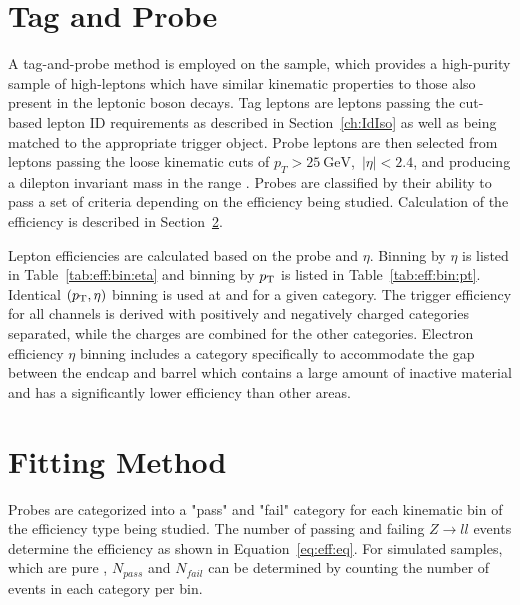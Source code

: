 % 
% 


\section{Tag and Probe}\label{ch:eff:tagandprobe}
A tag-and-probe method is employed on the \zll sample, which provides a high-purity sample of high-\pt leptons which have similar kinematic properties to those also present in the leptonic \W boson decays\cite{Khachatryan:2010xn}. Tag leptons are leptons passing the cut-based lepton ID requirements as described in Section~\ref{ch:IdIso} as well as being matched to the appropriate trigger object. Probe leptons are then selected from leptons passing the loose kinematic cuts of $p_T > 25 \mathrm{~GeV}$,~$|\eta|<2.4$, and producing a dilepton invariant mass in the range \masswindow. Probes are classified by their ability to pass a set of criteria depending on the efficiency being studied. Calculation of the efficiency is described in Section~\ref{ch:eff:fitting}.

Lepton efficiencies are calculated based on the probe \pt and $\eta$. Binning by $\eta$ is listed in Table~\ref{tab:eff:bin:eta} and binning by $p_{\mathrm{T}}$ is listed in Table~\ref{tab:eff:bin:pt}. Identical $(p_{\mathrm{T}},\eta)$ binning is used at \sg and \sh for a given category. The trigger efficiency for all channels is derived with positively and negatively charged categories separated, while the charges are combined for the other categories. Electron efficiency $\eta$ binning includes a category specifically to accommodate the gap between the endcap and barrel which contains a large amount of inactive material and has a significantly lower efficiency than other areas.






\section{Fitting Method}\label{ch:eff:fitting}
Probes are categorized into a "pass" and "fail" category for each kinematic bin of the efficiency type being studied. The number of passing and failing $Z\rightarrow ll$ events determine the efficiency as shown in Equation~\ref{eq:eff:eq}. For simulated samples, which are pure \zll, $N_{pass}$ and $N_{fail}$ can be determined by counting the number of events in each category per bin. 

